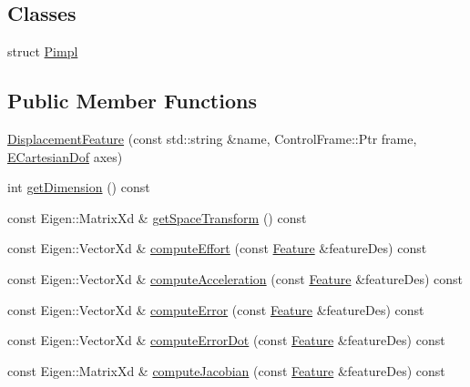 \subsection*{Classes}
\begin{DoxyCompactItemize}
\item 
struct \hyperlink{structocra_1_1DisplacementFeature_1_1Pimpl}{Pimpl}
\end{DoxyCompactItemize}
\subsection*{Public Member Functions}
\begin{DoxyCompactItemize}
\item 
\hyperlink{classocra_1_1DisplacementFeature_a9c48bb5ac5d4a856df9c2d879bc4b072}{Displacement\+Feature} (const std\+::string \&name, Control\+Frame\+::\+Ptr frame, \hyperlink{namespaceocra_a436781c7059a0f76027df1c652126260}{E\+Cartesian\+Dof} axes)
\item 
int \hyperlink{classocra_1_1DisplacementFeature_a5d6548c921c2ce61374d3f76114b7881}{get\+Dimension} () const
\item 
const Eigen\+::\+Matrix\+Xd \& \hyperlink{classocra_1_1DisplacementFeature_ad27f4aa83abea99ef893de6043b0bf68}{get\+Space\+Transform} () const
\item 
const Eigen\+::\+Vector\+Xd \& \hyperlink{classocra_1_1DisplacementFeature_a328fae77ec8a9942881e42226250a11b}{compute\+Effort} (const \hyperlink{classocra_1_1Feature}{Feature} \&feature\+Des) const
\item 
const Eigen\+::\+Vector\+Xd \& \hyperlink{classocra_1_1DisplacementFeature_a622cd1b7305b26fbbb2f78784fd0ebf0}{compute\+Acceleration} (const \hyperlink{classocra_1_1Feature}{Feature} \&feature\+Des) const
\item 
const Eigen\+::\+Vector\+Xd \& \hyperlink{classocra_1_1DisplacementFeature_a61d1caacf56e60bb3f33d2c91d5b89f2}{compute\+Error} (const \hyperlink{classocra_1_1Feature}{Feature} \&feature\+Des) const
\item 
const Eigen\+::\+Vector\+Xd \& \hyperlink{classocra_1_1DisplacementFeature_afd5e272957274c46a6331c2a3d3324df}{compute\+Error\+Dot} (const \hyperlink{classocra_1_1Feature}{Feature} \&feature\+Des) const
\item 
const Eigen\+::\+Matrix\+Xd \& \hyperlink{classocra_1_1DisplacementFeature_a87b3ef89ea6711a3f953f94e5cdf7e4d}{compute\+Jacobian} (const \hyperlink{classocra_1_1Feature}{Feature} \&feature\+Des) const
\item 

\end{DoxyCompactItemize}
